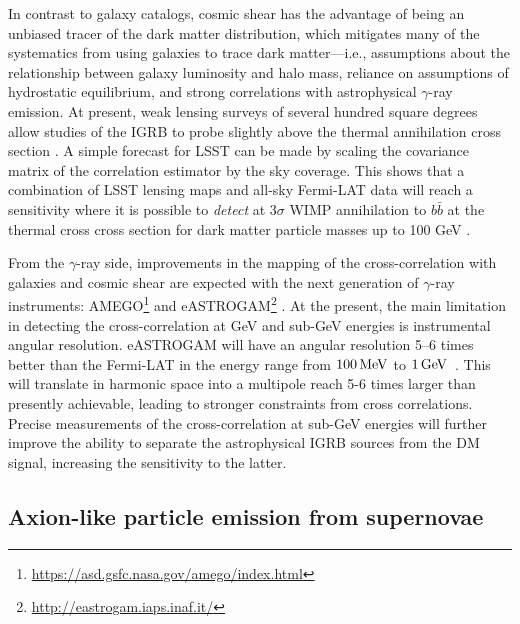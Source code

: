 In contrast to galaxy catalogs, cosmic shear has the advantage of being an unbiased tracer of the dark matter distribution, which mitigates many of the systematics from using galaxies to trace dark matter---i.e., assumptions about the relationship between galaxy luminosity and halo mass, reliance on assumptions of hydrostatic equilibrium, and strong correlations with astrophysical $\gamma$-ray emission. At present, weak lensing surveys of several hundred square degrees allow studies of the IGRB to probe slightly above the thermal annihilation cross section \citep{1404.5503,1607.02187,1611.03554}. A simple forecast for LSST can be made by scaling the covariance matrix of the correlation estimator by the sky coverage. This shows that a combination of LSST lensing maps and all-sky Fermi-LAT data will reach a sensitivity where it is possible to \textit{detect} at $3\sigma$ WIMP annihilation to $b\bar{b}$ at the thermal cross cross section for dark matter particle masses up to 100 GeV \citep{1404.5503}.   


From the $\gamma$-ray side, improvements in the mapping of the cross-correlation with galaxies and cosmic shear are expected with the next generation of $\gamma$-ray instruments: AMEGO\footnote{\url{https://asd.gsfc.nasa.gov/amego/index.html}} and eASTROGAM\footnote{\url{http://eastrogam.iaps.inaf.it/}} \citep{1711.01265}.
At the present, the main limitation in detecting the cross-correlation at GeV and sub-GeV energies is instrumental angular resolution.  
eASTROGAM will have an angular resolution 5--6 times better than the Fermi-LAT in the energy range from $100 \mathrm{\,MeV}$ to $1 \mathrm{\,GeV}$~\citep{1711.01265}. This will translate in harmonic space into a multipole reach 5-6 times larger than presently achievable, leading to stronger constraints from cross correlations.
Precise measurements of the cross-correlation at sub-GeV energies will further improve the ability to separate the astrophysical IGRB sources from the DM signal, increasing the sensitivity to the latter. 

\subsection{Axion-like particle emission from supernovae }
\label{sec:alp_id}

